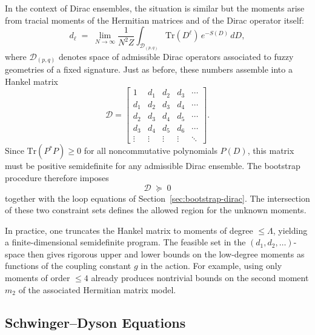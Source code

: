 \documentclass[11pt]{article}
\theoremstyle{plain}
\begin{document}
In the context of Dirac ensembles, the situation is similar but the moments arise from tracial moments of the Hermitian matrices and 
of the Dirac operator itself:
\[
d_\ell
  \;=\;
  \lim_{N\to\infty}
  \frac{1}{N^2 Z}
  \int_{\mathcal{D}_{(p,q)}} \mathrm{Tr}(D^\ell)\, e^{-S(D)}\, dD,
\]
where $\mathcal{D}_{(p,q)}$ denotes space of admissible Dirac operators associated to fuzzy geometries of a fixed signature. Just as before, these numbers assemble into a Hankel matrix
\[
\mathcal{D}
=
\begin{bmatrix}
1   &  d_1 &  d_2 & d_3 & \cdots\\
d_1 &  d_2 &  d_3 & d_4 & \cdots\\
d_2 &  d_3 &  d_4 & d_5 & \cdots\\
d_3 &  d_4 &  d_5 & d_6 & \cdots\\
\vdots & \vdots & \vdots & \vdots & \ddots
\end{bmatrix}.
\]
Since $\mathrm{Tr}(P^\ast P)\ge0$ for all noncommutative polynomials $P(D)$, this matrix must be positive
semidefinite for any admissible Dirac ensemble. The bootstrap procedure therefore imposes
\[
\mathcal{D} \;\succeq\; 0
\]
together with the loop equations of Section~\ref{sec:bootstrap-dirac}. The intersection of these two
constraint sets defines the allowed region for the unknown moments.


In practice, one truncates the Hankel matrix to moments of degree $\le \Lambda$, yielding a finite-dimensional
semidefinite program. The feasible set in the $(d_1,d_2,\dots)$-space then gives rigorous upper and lower
bounds on the low-degree moments as functions of the coupling constant $g$ in the action. For example, using
only moments of order $\le4$ already produces nontrivial bounds on the second moment $m_2$ of the associated
Hermitian matrix model.



\subsection{Schwinger--Dyson  Equations}
\end{document}
